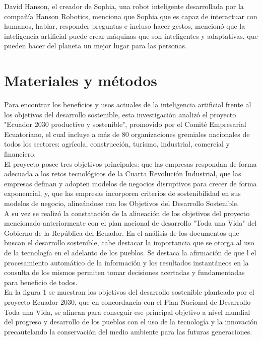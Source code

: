 \documentclass[preprint,12pt,3p]{elsarticle}
\begin{document}
David Hanson, el creador de Sophia, una robot inteligente desarrollada por la compañía Hanson Robotics, menciona que Sophia que es capaz de interactuar con humanos, hablar, responder preguntas e incluso hacer gestos, mencionó que la inteligencia artificial puede crear máquinas que son inteligentes y adaptativas, que pueden hacer del planeta un mejor lugar para las personas.

\section{Materiales y métodos}
\label{sec4}
Para encontrar los beneficios y usos actuales de la inteligencia artificial frente al los objetivos del desarrollo sostenible, esta investigación analizó el proyecto "Ecuador 2030 productivo y sostenible", promovido por el Comité Empresarial Ecuatoriano, el cual incluye a más de 80 organizaciones gremiales nacionales de todos los sectores: agrícola, construcción, turismo, industrial, comercial y financiero.\\

El proyecto posee tres objetivos principales: que las empresas respondan de forma adecuada a los retos tecnológicos de la Cuarta Revolución Industrial, que las empresas definan y adopten modelos de negocios disruptivos para crecer de forma exponencial, y, que las empresas incorporen criterios de sostenibilidad en sus modelos de negocio, alineándose con los Objetivos del Desarrollo Sostenible.\\

A su vez se realizó la constatación de la alineación de los objetivos del proyecto mencionado anteriormente con el plan nacional de desarrollo "Toda una Vida" del Gobierno de la República del Ecuador.
En el análisis de los documentos que buscan el desarrollo sostenible, cabe destacar la importancia que se otorga al uso de la tecnología en el adelanto de los pueblos. Se destaca la afirmación de que l el procesamiento automático de la información y los resultados instantáneos en la consulta de los mismos permiten tomar decisiones acertadas y fundamentadas para beneficio de todos.\\

En la figura 1 se muestran los objetivos del desarrollo sostenible planteado por el proyecto Ecuador 2030, que en concordancia con el Plan Nacional de Desarrollo Toda una Vida, se alinean para conseguir ese principal objetivo a nivel mundial del progreso y desarrollo de los pueblos con el uso de la tecnología y la innovación precautelando la conservación del medio ambiente para las futuras generaciones.\\
\end{document}
